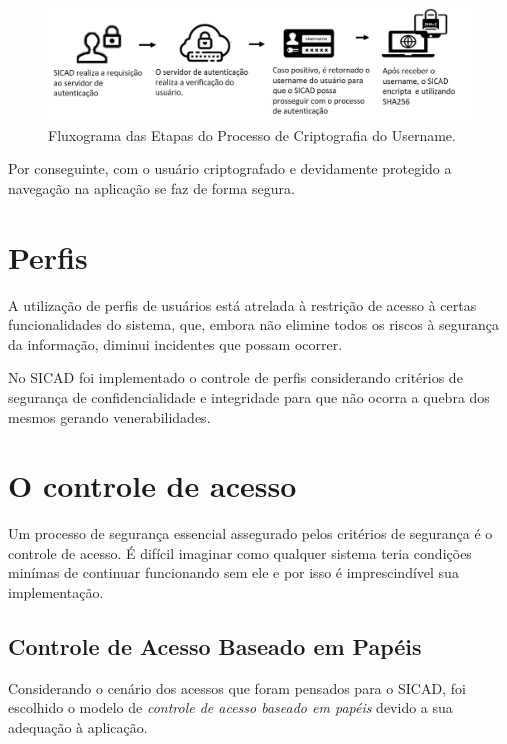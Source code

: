 \documentclass[12pt, a4paper]{report}
\begin{document}
\begin{figure}
\centering
\includegraphics[scale=0.80]{fluxograma_criptografia.jpg}
\caption{Fluxograma das Etapas do Processo de Criptografia do Username.}
\label{fig:fluxograma_criptografia}
\end{figure}

Por conseguinte, com o usuário criptografado e devidamente protegido a navegação na aplicação se faz de forma segura.

\section{Perfis}
\label{section:perfil}
A utilização de perfis de usuários está atrelada à restrição de acesso à certas funcionalidades do sistema, que, embora não elimine todos os riscos à segurança da informação, diminui incidentes que possam ocorrer.

No \ac{SICAD} foi implementado o controle de perfis considerando critérios de segurança de confidencialidade e integridade  para que não ocorra a quebra dos mesmos gerando venerabilidades.

\section{O controle de acesso}
Um processo de segurança essencial assegurado pelos critérios de segurança é o controle de acesso. É difícil imaginar como qualquer sistema teria condições minímas de continuar funcionando sem ele e por isso é imprescindível sua implementação.

\subsection{Controle  de  Acesso  Baseado  em  Papéis}
Considerando o cenário dos acessos que foram pensados para o \ac{SICAD}, foi escolhido o modelo de \textit{controle  de  acesso  baseado  em  papéis} devido a sua adequação à aplicação.
\end{document}
